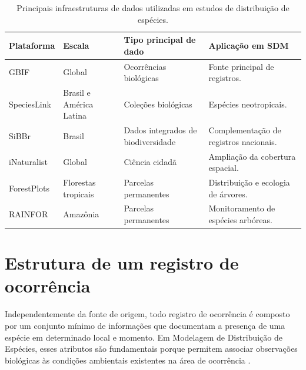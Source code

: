 \begin{table}[H]
	\centering
	\caption{Principais infraestruturas de dados utilizadas em estudos de distribuição de espécies.}
	\label{tab:bases_biodiversidade}
	\begin{tabular}{p{3cm}p{4cm}p{3cm}p{4cm}}
		\toprule
		\textbf{Plataforma} &
		\textbf{Escala} &
		\textbf{Tipo principal de dado} &
		\textbf{Aplicação em SDM} \\
		\midrule
		
		GBIF &
		Global &
		Ocorrências biológicas &
		Fonte principal de registros.
		
		\\
		
		SpeciesLink &
		Brasil e América Latina &
		Coleções biológicas &
		Espécies neotropicais.
		
		\\
		
		SiBBr &
		Brasil &
		Dados integrados de biodiversidade &
		Complementação de registros nacionais.
		
		\\
		
		iNaturalist &
		Global &
		Ciência cidadã &
		Ampliação da cobertura espacial.
		
		\\
		
		ForestPlots &
		Florestas tropicais &
		Parcelas permanentes &
		Distribuição e ecologia de árvores.
		
		\\
		
		RAINFOR &
		Amazônia &
		Parcelas permanentes &
		Monitoramento de espécies arbóreas.
		
		\\
		\bottomrule
	\end{tabular}
\end{table}

\section{Estrutura de um registro de ocorrência}

Independentemente da fonte de origem, todo registro de ocorrência é composto por um conjunto mínimo de informações que documentam a presença de uma espécie em determinado local e momento. Em Modelagem de Distribuição de Espécies, esses atributos são fundamentais porque permitem associar observações biológicas às condições ambientais existentes na área de ocorrência \parencite{peterson2011ecological,franklin2010mapping}.

